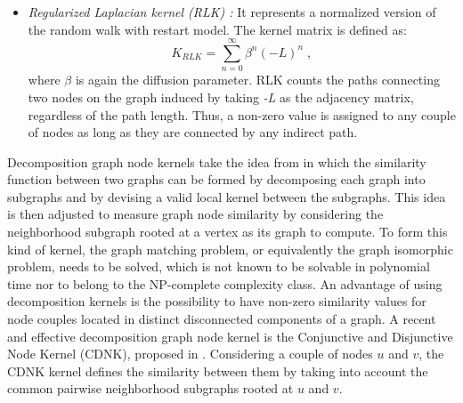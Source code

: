 \begin{itemize}
\item \textit{Regularized Laplacian kernel (RLK) \cite{proceeding4}:} It represents a normalized version of the random walk with restart model. The kernel matrix is defined as:
\begin{equation}
K_{RLK} = \sum_{n=0}^{\infty}\beta^{n}(-L)^n\; ,
\end{equation}
where $\beta$ is again the diffusion parameter. RLK counts the paths connecting two nodes on the graph induced by taking \textit{-L} as the adjacency matrix, regardless of the path length. Thus, a non-zero value is assigned to any couple of nodes as long as they are connected by any indirect path.
\end{itemize}
Decomposition graph node kernels take the idea from \cite{proceeding5} in which the similarity function between two graphs can be formed by decomposing each graph into subgraphs and by devising a valid local kernel between the subgraphs. This idea is then adjusted to measure graph node similarity by considering the neighborhood subgraph rooted at a vertex as its graph to compute. To form this kind of kernel, the graph matching problem, or equivalently the graph isomorphic problem, needs to be solved, which is not known to be solvable in polynomial time nor to belong to the NP-complete complexity class. An advantage of using decomposition kernels is the possibility to have non-zero similarity values for node couples located in distinct disconnected components of a graph. A recent and effective decomposition graph node kernel is the Conjunctive and Disjunctive Node Kernel (CDNK), proposed in \cite{proceeding6}. Considering a couple of nodes $u$ and $v$, the CDNK kernel defines the similarity between them by taking into account the common pairwise neighborhood subgraphs rooted at $u$ and $v$.
